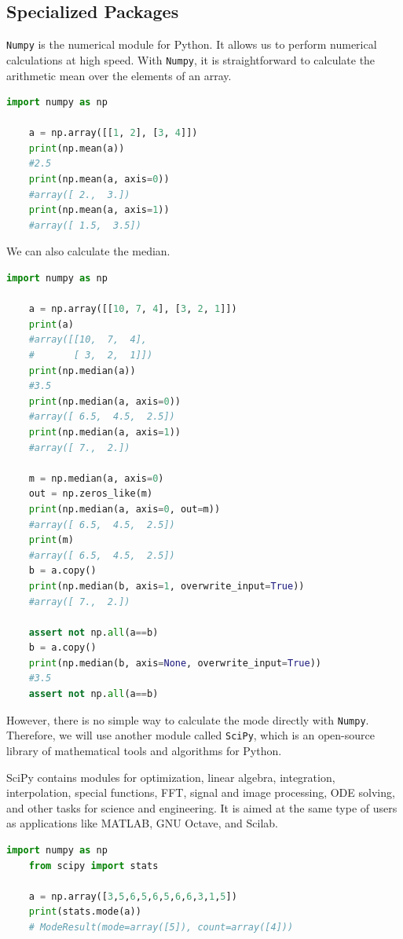 
\subsection{Specialized Packages}

\texttt{Numpy} is the numerical module for Python. It allows us to perform numerical calculations at high speed. With \texttt{Numpy}, it is straightforward to calculate the arithmetic mean over the elements of an array.

\begin{lstlisting}[language=Python]
	import numpy as np
	
	a = np.array([[1, 2], [3, 4]])
	print(np.mean(a))
	#2.5
	print(np.mean(a, axis=0))
	#array([ 2.,  3.])
	print(np.mean(a, axis=1))
	#array([ 1.5,  3.5])
\end{lstlisting}


We can also calculate the median.
\begin{lstlisting}[language=Python]
	import numpy as np
	
	a = np.array([[10, 7, 4], [3, 2, 1]])
	print(a)
	#array([[10,  7,  4],
	#       [ 3,  2,  1]])
	print(np.median(a))
	#3.5
	print(np.median(a, axis=0))
	#array([ 6.5,  4.5,  2.5])
	print(np.median(a, axis=1))
	#array([ 7.,  2.])
	
	m = np.median(a, axis=0)
	out = np.zeros_like(m)
	print(np.median(a, axis=0, out=m))
	#array([ 6.5,  4.5,  2.5])
	print(m)
	#array([ 6.5,  4.5,  2.5])
	b = a.copy()
	print(np.median(b, axis=1, overwrite_input=True))
	#array([ 7.,  2.])
	
	assert not np.all(a==b)
	b = a.copy()
	print(np.median(b, axis=None, overwrite_input=True))
	#3.5
	assert not np.all(a==b)
\end{lstlisting}

However, there is no simple way to calculate the mode directly with \texttt{Numpy}. Therefore, we will use another module called \texttt{SciPy}, which is an open-source library of mathematical tools and algorithms for Python.

SciPy contains modules for optimization, linear algebra, integration, interpolation, special functions, FFT, signal and image processing, ODE solving, and other tasks for science and engineering. It is aimed at the same type of users as applications like MATLAB, GNU Octave, and Scilab.

\begin{lstlisting}[language=Python]
	import numpy as np
	from scipy import stats
	
	a = np.array([3,5,6,5,6,5,6,6,3,1,5])
	print(stats.mode(a))
	# ModeResult(mode=array([5]), count=array([4]))
\end{lstlisting}
